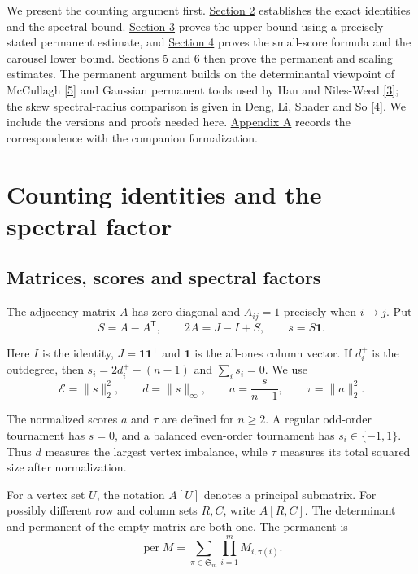 \documentclass[11pt,a4paper]{article}
\newcommand{\paperref}[2]{\hyperref[#1]{#2}}
\begin{document}
We present the counting argument first. \paperref{sec-2}{Section 2} establishes the exact identities and the spectral bound. \paperref{sec-3}{Section 3} proves the upper bound using a precisely stated permanent estimate, and \paperref{sec-4}{Section 4} proves the small-score formula and the carousel lower bound. \paperref{sec-5}{Sections 5} and 6 then prove the permanent and scaling estimates. The permanent argument builds on the determinantal viewpoint of McCullagh \paperref{bib-5}{[5]} and Gaussian permanent tools used by Han and Niles-Weed \paperref{bib-3}{[3]}; the skew spectral-radius comparison is given in Deng, Li, Shader and So \paperref{bib-4}{[4]}. We include the versions and proofs needed here. \paperref{sec-A}{Appendix A} records the correspondence with the companion formalization.

\section{Counting identities and the spectral factor}\label{sec-2}

\subsection{Matrices, scores and spectral factors}\label{sec-2.1}

The adjacency matrix \(A\) has zero diagonal and \(A_{ij}=1\) precisely when \(i\to j\). Put
\[S=A-A^{\mathsf T},\qquad 2A=J-I+S,\qquad s=S\mathbf1.\]

Here \(I\) is the identity, \(J=\mathbf1\mathbf1^{\mathsf T}\) and \(\mathbf1\) is the all-ones column vector. If \(d_i^+\) is the outdegree, then \(s_i=2d_i^+-(n-1)\) and \(\sum_i s_i=0\). We use
\[\mathcal E=\|s\|_2^2,\qquad d=\|s\|_\infty,\qquad
a=\frac{s}{n-1},\qquad \tau=\|a\|_2^2.\]

The normalized scores \(a\) and \(\tau\) are defined for \(n\ge2\). A regular odd-order tournament has \(s=0\), and a balanced even-order tournament has \(s_i\in\{-1,1\}\). Thus \(d\) measures the largest vertex imbalance, while \(\tau\) measures its total squared size after normalization.

For a vertex set \(U\), the notation \(A[U]\) denotes a principal submatrix. For possibly different row and column sets \(R,C\), write \(A[R,C]\). The determinant and permanent of the empty matrix are both one. The permanent is
\[\operatorname{per}M=\sum_{\pi\in\mathfrak S_m}\prod_{i=1}^m M_{i,\pi(i)}.\]
\end{document}
